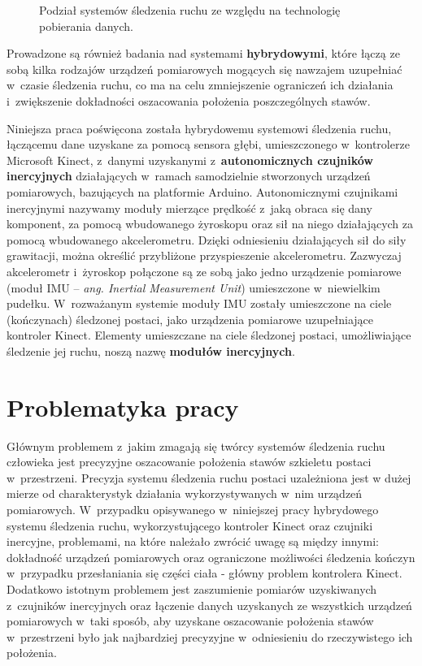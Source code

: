 \begin{savenotes}
	\begin{figure}[!htb]
		\centering
		
		\caption{Podział systemów śledzenia ruchu ze względu na technologię pobierania danych.}
		\label{fig:literature:mocapSystems:diagram}
	\end{figure}
\end{savenotes}
Prowadzone są również badania nad systemami \textbf{hybrydowymi}, które łączą ze sobą kilka rodzajów urządzeń pomiarowych mogących się nawzajem uzupełniać w~czasie śledzenia ruchu, co ma na celu zmniejszenie ograniczeń ich działania i~zwiększenie dokładności oszacowania położenia poszczególnych stawów.

Niniejsza praca poświęcona została hybrydowemu systemowi śledzenia ruchu, łączącemu dane uzyskane za pomocą sensora głębi, umieszczonego w~kontrolerze Microsoft Kinect, z~danymi uzyskanymi z~\textbf{autonomicznych czujników inercyjnych} działających w~ramach samodzielnie stworzonych urządzeń pomiarowych, bazujących na platformie Arduino. Autonomicznymi czujnikami inercyjnymi nazywamy moduły mierzące prędkość z~jaką obraca się dany komponent, za pomocą wbudowanego żyroskopu oraz sił na niego działających za pomocą wbudowanego akcelerometru. Dzięki odniesieniu działających sił do siły grawitacji, można określić przybliżone przyspieszenie akcelerometru.
Zazwyczaj akcelerometr i~żyroskop połączone są ze sobą jako jedno urządzenie pomiarowe (moduł IMU -- \emph{ang. Inertial Measurement Unit}) umieszczone w~niewielkim pudełku. W~rozważanym systemie moduły IMU zostały umieszczone na ciele (kończynach) śledzonej postaci, jako urządzenia pomiarowe uzupełniające kontroler Kinect. Elementy umieszczane na ciele śledzonej postaci, umożliwiające śledzenie jej ruchu, noszą nazwę \textbf{modułów inercyjnych}. \\

\section{Problematyka pracy}
Głównym problemem z~jakim zmagają się twórcy systemów śledzenia ruchu człowieka jest precyzyjne oszacowanie położenia stawów szkieletu postaci w~przestrzeni. Precyzja systemu śledzenia ruchu postaci uzależniona jest w dużej mierze od charakterystyk działania wykorzystywanych w~nim urządzeń pomiarowych. W~przypadku opisywanego w~niniejszej pracy hybrydowego systemu śledzenia ruchu, wykorzystującego kontroler Kinect oraz czujniki inercyjne, problemami, na które należało zwrócić uwagę są między innymi: dokładność urządzeń pomiarowych oraz ograniczone możliwości śledzenia kończyn w~przypadku przesłaniania się części ciała - główny problem kontrolera Kinect. Dodatkowo istotnym problemem jest zaszumienie pomiarów uzyskiwanych z~czujników inercyjnych oraz łączenie danych uzyskanych ze wszystkich urządzeń pomiarowych w~taki sposób, aby uzyskane oszacowanie położenia stawów w~przestrzeni było jak najbardziej precyzyjne w~odniesieniu do rzeczywistego ich położenia.\\

